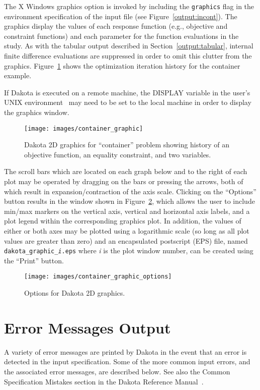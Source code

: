 The X Windows graphics option is invoked by including the
\texttt{graphics} flag in the environment specification of the input
file (see Figure~\ref{output:incont}). The graphics display the values
of each response function (e.g., objective and constraint functions)
and each parameter for the function evaluations in the study. As with
the tabular output described in Section~\ref{output:tabular}, internal
finite difference evaluations are suppressed in order to omit this
clutter from the graphics.  Figure~\ref{output:2dcont} shows the
optimization iteration history for the container example.

If Dakota is executed on a remote machine, the DISPLAY variable in the
user's UNIX environment~\cite{Gil92} may need to be set to the local
machine in order to display the graphics window. 

\begin{figure}
\centering
\texttt{[image: images/container\_graphic]}
\caption{Dakota 2D graphics for ``container'' problem showing history of
an objective function, an equality constraint, and two variables.}
\label{output:2dcont}
\end{figure}

The scroll bars which are located on each graph below and to the right
of each plot may be operated by dragging on the bars or pressing the
arrows, both of which result in expansion/contraction of the axis
scale. Clicking on the ``Options'' button results in the window shown
in Figure~\ref{output:2dcontoptions}, which allows the user to include
min/max markers on the vertical axis, vertical and horizontal axis
labels, and a plot legend within the corresponding graphics plot.  In
addition, the values of either or both axes may be plotted using a
logarithmic scale (so long as all plot values are greater than zero)
and an encapsulated postscript (EPS) file, named 
\texttt{dakota\_graphic\_\emph{i}.eps} where \emph{i} is the plot 
window number, can be created using the ``Print'' button.
\begin{figure}
\centering
\texttt{[image: images/container\_graphic\_options]}
\caption{Options for Dakota 2D graphics.}
\label{output:2dcontoptions}
\end{figure}


\section{Error Messages Output}\label{output:error}

A variety of error messages are printed by Dakota in the event that an
error is detected in the input specification. Some of the more common
input errors, and the associated error messages, are described below.
See also the Common Specification Mistakes section in the Dakota
Reference Manual~\cite{RefMan}.

